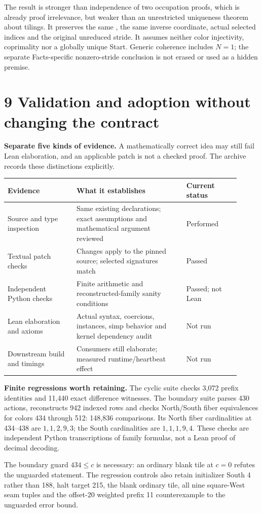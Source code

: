 \documentclass[11pt,letterpaper]{article}
\newcommand{\code}[1]{{\small\texttt{\detokenize{#1}}}}
\newcommand{\pageheading}[1]{\newpage\section*{#1}}
\begin{document}
The result is stronger than independence of two occupation proofs, which is already proof irrelevance, but weaker than an unrestricted uniqueness theorem about tilings. It preserves the same \code{c}, the same inverse coordinate, actual selected indices and the original unreduced stride. It assumes neither color injectivity, coprimality nor a globally unique Start. Generic coherence includes \(N=1\); the separate Facts-specific nonzero-stride conclusion is not erased or used as a hidden premise.

\pageheading{9 Validation and adoption without changing the contract}
\textbf{Separate five kinds of evidence.} A mathematically correct idea may still fail Lean elaboration, and an applicable patch is not a checked proof. The archive records these distinctions explicitly.

\begin{tabular}{@{}L{0.27\linewidth}L{0.43\linewidth}L{0.21\linewidth}@{}}\toprule
Evidence & What it establishes & Current status\\\midrule
Source and type inspection & Same existing declarations; exact assumptions and mathematical argument reviewed & Performed\\[4pt]
Textual patch checks & Changes apply to the pinned source; selected signatures match & Passed\\[4pt]
Independent Python checks & Finite arithmetic and reconstructed-family sanity conditions & Passed; not Lean\\[4pt]
Lean elaboration and axioms & Actual syntax, coercions, instances, simp behavior and kernel dependency audit & Not run\\[4pt]
Downstream build and timings & Consumers still elaborate; measured runtime/heartbeat effect & Not run\\\bottomrule
\end{tabular}

\textbf{Finite regressions worth retaining.} The cyclic suite checks 3,072 prefix identities and 11,440 exact difference witnesses. The boundary suite parses 430 actions, reconstructs 942 indexed rows and checks North/South fiber equivalences for colors 434 through 512: 148,836 comparisons. Its North fiber cardinalities at 434--438 are \(1,1,2,9,3\); the South cardinalities are \(1,1,1,9,4\). These checks are independent Python transcriptions of family formulas, not a Lean proof of decimal decoding.

The boundary guard \(434\le c\) is necessary: an ordinary blank tile at \(c=0\) refutes the unguarded statement. The regression controls also retain initializer South 4 rather than 188, halt target 215, the blank ordinary tile, all nine square-West seam tuples and the offset-20 weighted prefix 11 counterexample to the unguarded error bound.
\end{document}
